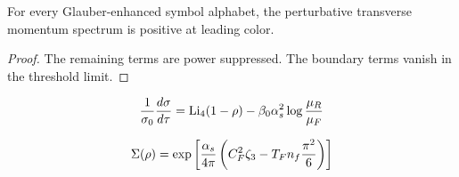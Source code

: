 \begin{corollary}\label{thm:2}
For every Glauber-enhanced symbol alphabet, the perturbative transverse
momentum spectrum is positive at leading color.
\end{corollary}

\begin{proof}
The remaining terms are power suppressed. The boundary terms vanish in
the threshold limit.
\end{proof}

\begin{equation}
  \frac{1}{\sigma_0} \frac{d\sigma}{d\tau} = \mathrm{Li}_{4}(1 - \rho) - \beta_0 \alpha_s^2 \log\frac{\mu_R}{\mu_F}
  \label{eq:6}
\end{equation}

\begin{equation}
  \Sigma(\rho) = \exp\left[\frac{\alpha_s}{4\pi} \left( C_F^2 \zeta_{3} - T_F n_f \frac{\pi^2}{6} \right)\right]
  \label{eq:8}
\end{equation}

